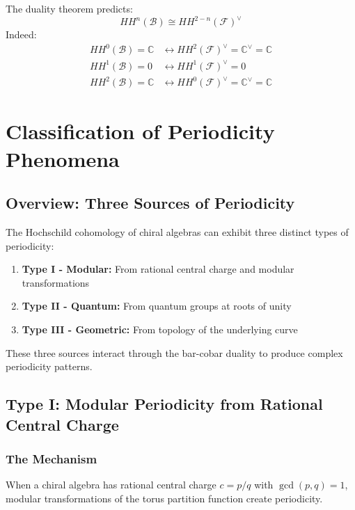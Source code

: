 \begin{verification}
The duality theorem predicts:
\[
HH^n(\mathcal{B}) \cong HH^{2-n}(\mathcal{F})^{\vee}
\]
Indeed:
\begin{align}
HH^0(\mathcal{B}) = \mathbb{C} &\leftrightarrow HH^2(\mathcal{F})^{\vee} = \mathbb{C}^{\vee} = \mathbb{C} \\
HH^1(\mathcal{B}) = 0 &\leftrightarrow HH^1(\mathcal{F})^{\vee} = 0 \\
HH^2(\mathcal{B}) = \mathbb{C} &\leftrightarrow HH^0(\mathcal{F})^{\vee} = \mathbb{C}^{\vee} = \mathbb{C}
\end{align}
\end{verification}

\section{Classification of Periodicity Phenomena}

\subsection{Overview: Three Sources of Periodicity}

The Hochschild cohomology of chiral algebras can exhibit three distinct types of periodicity:

\begin{enumerate}
\item \textbf{Type I - Modular:} From rational central charge and modular transformations
\item \textbf{Type II - Quantum:} From quantum groups at roots of unity
\item \textbf{Type III - Geometric:} From topology of the underlying curve
\end{enumerate}

These three sources interact through the bar-cobar duality to produce complex periodicity patterns.

\subsection{Type I: Modular Periodicity from Rational Central Charge}

\subsubsection{The Mechanism}

When a chiral algebra has rational central charge $c = p/q$ with $\gcd(p,q) = 1$, modular transformations of the torus partition function create periodicity.

